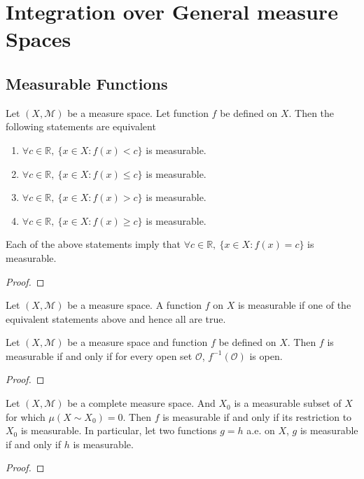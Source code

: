\section{Integration over General measure Spaces}
\subsection{Measurable Functions}

\begin{theorem}
	Let $(X,\mathcal{M})$ be a measure space.
	Let function $f$ be defined on $X$.
	Then the following statements are equivalent
	\begin{enumerate}
		\item $\forall c \in \mathbb{R},\ \{ x \in X : f(x) < c \}$ is measurable.
		\item $\forall c \in \mathbb{R},\ \{ x \in X : f(x) \le c \}$ is measurable.
		\item $\forall c \in \mathbb{R},\ \{ x \in X : f(x) > c \}$ is measurable.
		\item $\forall c \in \mathbb{R},\ \{ x \in X : f(x) \ge c \}$ is measurable.
	\end{enumerate}
	Each of the above statements imply that $\forall c \in \mathbb{R},\ \{ x \in X : f(x) = c \}$ is measurable.
\end{theorem}
\begin{proof}
\end{proof}

\begin{definition} 
	Let $(X,\mathcal{M})$ be a measure space.
	A function $f$ on $X$ is measurable if one of the equivalent statements above and  hence all are true.
\end{definition}

\begin{theorem}
	Let $(X,\mathcal{M})$ be a measure space and function $f$ be defined on $X$.
	Then $f$ is measurable if and only if for every open set $\mathcal{O}$, $f^{-1}(\mathcal{O})$ is open.
\end{theorem}
\begin{proof}
\end{proof}

\begin{theorem}
	Let $(X,\mathcal{M})$ be a complete measure space.
	And $X_0$ is a measurable subset of $X$ for which $\mu(X \sim X_0) = 0$.
	Then $f$ is measurable if and only if its restriction to $X_0$ is measurable.
	In particular, let two functions $g = h$ a.e. on $X$, $g$ is measurable if and only if $h$ is measurable.
\end{theorem}
\begin{proof}
\end{proof}

